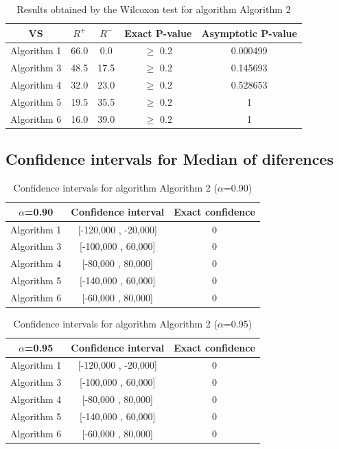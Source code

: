 \documentclass[a4paper,10pt]{article}
\begin{document}
\begin{table}[!htp]
\centering\small
\begin{tabular}{
|c|c|c|c|c|}
\hline
 VS & $R^{+}$ & $R^{-}$ & Exact P-value & Asymptotic P-value \\ \hline 
Algorithm 1 & 66.0 & 0.0 & $\geq$ 0.2 & 0.000499\\ \hline 
Algorithm 3 & 48.5 & 17.5 & $\geq$ 0.2 & 0.145693\\ \hline 
Algorithm 4 & 32.0 & 23.0 & $\geq$ 0.2 & 0.528653\\ \hline 
Algorithm 5 & 19.5 & 35.5 & $\geq$ 0.2 & 1\\ \hline 
Algorithm 6 & 16.0 & 39.0 & $\geq$ 0.2 & 1\\ \hline 

\end{tabular}
\caption{Results obtained by the Wilcoxon test for algorithm Algorithm 2}
\end{table}

\subsection{Confidence intervals for Median of diferences}

\begin{table}[!htp]
\centering\small
\begin{tabular}{
|c|c|c|}
\hline
 $\alpha$=0.90 & Confidence interval & Exact confidence \\ \hline 
Algorithm 1 & [-120,000 , -20,000] & 0\\ \hline 
Algorithm 3 & [-100,000 , 60,000] & 0\\ \hline 
Algorithm 4 & [-80,000 , 80,000] & 0\\ \hline 
Algorithm 5 & [-140,000 , 60,000] & 0\\ \hline 
Algorithm 6 & [-60,000 , 80,000] & 0\\ \hline 

\end{tabular}
\caption{Confidence intervals for algorithm Algorithm 2 ($\alpha$=0.90)}
\end{table}
\begin{table}[!htp]
\centering\small
\begin{tabular}{
|c|c|c|}
\hline
 $\alpha$=0.95 & Confidence interval & Exact confidence \\ \hline 
Algorithm 1 & [-120,000 , -20,000] & 0\\ \hline 
Algorithm 3 & [-100,000 , 60,000] & 0\\ \hline 
Algorithm 4 & [-80,000 , 80,000] & 0\\ \hline 
Algorithm 5 & [-140,000 , 60,000] & 0\\ \hline 
Algorithm 6 & [-60,000 , 80,000] & 0\\ \hline 

\end{tabular}
\caption{Confidence intervals for algorithm Algorithm 2 ($\alpha$=0.95)}
\end{table}
\end{document}
